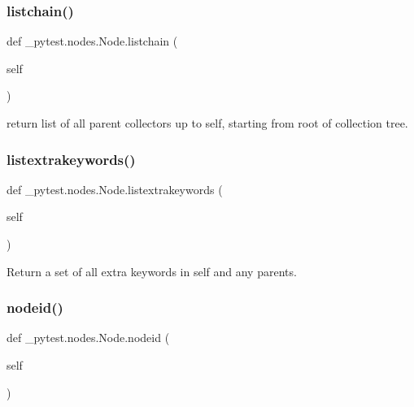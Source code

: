 \subsubsection{\texorpdfstring{listchain()}{listchain()}}
{\footnotesize\ttfamily def \+\_\+pytest.\+nodes.\+Node.\+listchain (\begin{DoxyParamCaption}\item[{}]{self }\end{DoxyParamCaption})}

\begin{DoxyVerb}return list of all parent collectors up to self,
    starting from root of collection tree. \end{DoxyVerb}
 \mbox{\label{class__pytest_1_1nodes_1_1_node_abd89ec1da759bf88a82025cf125a7b14}} 
\subsubsection{\texorpdfstring{listextrakeywords()}{listextrakeywords()}}
{\footnotesize\ttfamily def \+\_\+pytest.\+nodes.\+Node.\+listextrakeywords (\begin{DoxyParamCaption}\item[{}]{self }\end{DoxyParamCaption})}

\begin{DoxyVerb}Return a set of all extra keywords in self and any parents.\end{DoxyVerb}
 \mbox{\label{class__pytest_1_1nodes_1_1_node_a02f18acbfaf1f9d8ba9b6c1346dc6217}} 
\subsubsection{\texorpdfstring{nodeid()}{nodeid()}}
{\footnotesize\ttfamily def \+\_\+pytest.\+nodes.\+Node.\+nodeid (\begin{DoxyParamCaption}\item[{}]{self }\end{DoxyParamCaption})}

